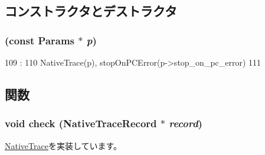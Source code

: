 \subsection{コンストラクタとデストラクタ}
\hypertarget{classTrace_1_1ArmNativeTrace_a6699da1dc0472e2f7ce1251437768491}{
\subsubsection[{ArmNativeTrace}]{ (const {\bf Params} $\ast$ {\em p})}}
\label{classTrace_1_1ArmNativeTrace_a6699da1dc0472e2f7ce1251437768491}



\begin{DoxyCode}
109                                     :
110         NativeTrace(p), stopOnPCError(p->stop_on_pc_error)
111     {}

\end{DoxyCode}


\subsection{関数}
\hypertarget{classTrace_1_1ArmNativeTrace_a826e1279dfa7dd9ce6760a2e6efe4116}{
\subsubsection[{check}]{\setlength{\rightskip}{0pt plus 5cm}void check ({\bf NativeTraceRecord} $\ast$ {\em record})}}
\label{classTrace_1_1ArmNativeTrace_a826e1279dfa7dd9ce6760a2e6efe4116}


\hyperlink{classTrace_1_1NativeTrace_adb484644aa43b4370d31b6a7286b0dd1}{NativeTrace}を実装しています。


